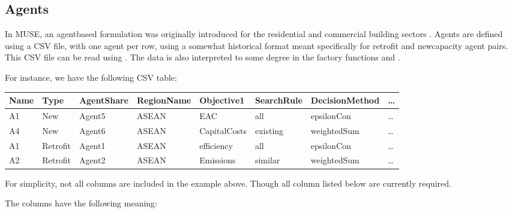 \documentclass[letterpaper,10pt,english]{sphinxmanual}
\begin{document}
\subsection{Agents}
\label{\detokenize{inputs/agents:agents}}\label{\detokenize{inputs/agents:inputs-agents}}\label{\detokenize{inputs/agents::doc}}
In MUSE, an agent\sphinxhyphen{}based formulation was originally introduced for the residential and
commercial building sectors .  Agents are defined using a CSV file, with
one agent per row, using a somewhat historical format meant specifically for retrofit
and new\sphinxhyphen{}capacity agent pairs. This CSV file can be read using
. The data is also
interpreted to some degree in the factory functions
 and
.

For instance, we have the following CSV table:


\begin{savenotes}\sphinxattablestart
\centering
\begin{tabulary}{\linewidth}[t]{|T|T|T|T|T|T|T|T|}
\hline
\sphinxstyletheadfamily 
Name
&\sphinxstyletheadfamily 
Type
&\sphinxstyletheadfamily 
AgentShare
&\sphinxstyletheadfamily 
RegionName
&\sphinxstyletheadfamily 
Objective1
&\sphinxstyletheadfamily 
SearchRule
&\sphinxstyletheadfamily 
DecisionMethod
&\sphinxstyletheadfamily 
…
\\
\hline
A1
&
New
&
Agent5
&
ASEAN
&
EAC
&
all
&
epsilonCon
&
…
\\
\hline
A4
&
New
&
Agent6
&
ASEAN
&
CapitalCosts
&
existing
&
weightedSum
&
…
\\
\hline
A1
&
Retrofit
&
Agent1
&
ASEAN
&
efficiency
&
all
&
epsilonCon
&
…
\\
\hline
A2
&
Retrofit
&
Agent2
&
ASEAN
&
Emissions
&
similar
&
weightedSum
&
…
\\
\hline
\end{tabulary}
\par
\sphinxattableend\end{savenotes}

For simplicity, not all columns are included in the example above. Though all column
listed below are currently required.

The columns have the following meaning:
\end{document}
